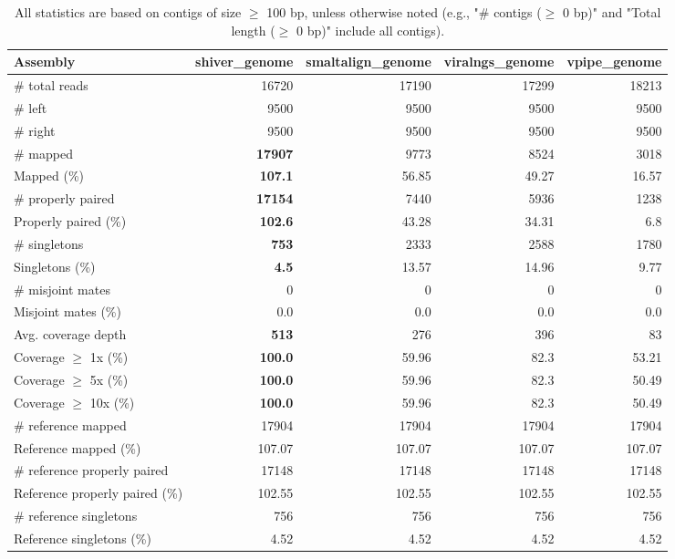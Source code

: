 \documentclass[12pt,a4paper]{article}
\begin{document}
\begin{table}[ht]
\begin{center}
\caption{All statistics are based on contigs of size $\geq$ 100 bp, unless otherwise noted (e.g., "\# contigs ($\geq$ 0 bp)" and "Total length ($\geq$ 0 bp)" include all contigs).}
\begin{tabular}{|l*{4}{|r}|}
\hline
Assembly & shiver\_genome & smaltalign\_genome & viralngs\_genome & vpipe\_genome \\ \hline
\# total reads & 16720 & 17190 & 17299 & 18213 \\ \hline
\# left & 9500 & 9500 & 9500 & 9500 \\ \hline
\# right & 9500 & 9500 & 9500 & 9500 \\ \hline
\# mapped & {\bf 17907} & 9773 & 8524 & 3018 \\ \hline
Mapped (\%) & {\bf 107.1} & 56.85 & 49.27 & 16.57 \\ \hline
\# properly paired & {\bf 17154} & 7440 & 5936 & 1238 \\ \hline
Properly paired (\%) & {\bf 102.6} & 43.28 & 34.31 & 6.8 \\ \hline
\# singletons & {\bf 753} & 2333 & 2588 & 1780 \\ \hline
Singletons (\%) & {\bf 4.5} & 13.57 & 14.96 & 9.77 \\ \hline
\# misjoint mates & 0 & 0 & 0 & 0 \\ \hline
Misjoint mates (\%) & 0.0 & 0.0 & 0.0 & 0.0 \\ \hline
Avg. coverage depth & {\bf 513} & 276 & 396 & 83 \\ \hline
Coverage $\geq$ 1x (\%) & {\bf 100.0} & 59.96 & 82.3 & 53.21 \\ \hline
Coverage $\geq$ 5x (\%) & {\bf 100.0} & 59.96 & 82.3 & 50.49 \\ \hline
Coverage $\geq$ 10x (\%) & {\bf 100.0} & 59.96 & 82.3 & 50.49 \\ \hline
\# reference mapped & 17904 & 17904 & 17904 & 17904 \\ \hline
Reference mapped (\%) & 107.07 & 107.07 & 107.07 & 107.07 \\ \hline
\# reference properly paired & 17148 & 17148 & 17148 & 17148 \\ \hline
Reference properly paired (\%) & 102.55 & 102.55 & 102.55 & 102.55 \\ \hline
\# reference singletons & 756 & 756 & 756 & 756 \\ \hline
Reference singletons (\%) & 4.52 & 4.52 & 4.52 & 4.52 \\ \hline

\end{tabular}
\end{center}
\end{table}
\end{document}
